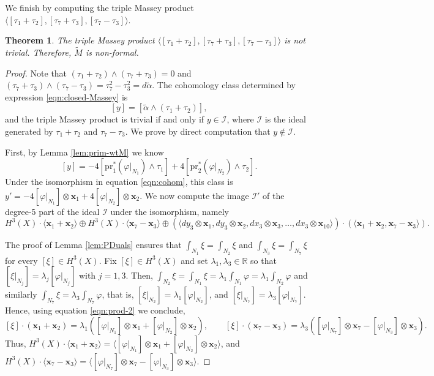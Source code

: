 \documentclass[10pt]{article}
\newcommand{\R}{\mathbb R}
\newcommand{\la}{\langle}
\newcommand{\ra}{\rangle}
\theoremstyle{plain}
\newtheorem{theorem}[proposition]{Theorem}
\theoremstyle{definition}
\theoremstyle{remark}
\begin{document}
We finish by computing the triple Massey product $\la [\tau_1 + \tau_2], [\tau_7+ \tau_3], [\tau_7-\tau_3] \ra$. 


\begin{theorem} \label {theo:non-formal}
The triple Massey product $\la [\tau_1 + \tau_2], [\tau_7+ \tau_3], [\tau_7-\tau_3] \ra$ is not trivial.
Therefore, $\widetilde{M}$ is non-formal.
\end{theorem}
\begin{proof}
Note that $(\tau_1 + \tau_2)\wedge (\tau_7+ \tau_3) =0$ and $(\tau_7+ \tau_3)\wedge (\tau_7-\tau_3)=\tau_7^2-\tau_3^2=d\widetilde{\alpha}$. The cohomology class determined by expression \eqref{eqn:closed-Massey} is
$$
[y]= [\widetilde{\alpha}\wedge (\tau_1 + \tau_2)],
$$
and the triple Massey product is trivial if and only if $y\in \mathcal{I}$, where
$\mathcal{I}$ is the ideal generated by $\tau_1 + \tau_2$ and $\tau_7-\tau_3$. We prove by direct computation that $y\notin \mathcal{I}$. 

First, by Lemma \ref{lem:prim-wtM} we know
$$
[y]= -4[\mathrm{pr}_1^*(\varphi|_{N_1}) \wedge \tau_1] + 4 [\mathrm{pr}_2^*(\varphi|_{N_2}) \wedge \tau_2].
$$
Under the isomorphism in equation \eqref{eqn:cohom}, this class is $y'=-4[\varphi|_{N_1}] \otimes \mathbf{x}_1 + 4[\varphi|_{N_2}]\otimes \mathbf{x}_2$.
We now compute the image  $\mathcal{I}'$ of the degree-5 part of the ideal $\mathcal{I}$ under the isomorphism,
namely
$$
H^3(X)\cdot \la \mathbf{x}_1+\mathbf{x}_2 \ra \oplus
H^3(X) \cdot \la \mathbf{x}_7-\mathbf{x}_3 \ra
\oplus (\la dy_3 \otimes \mathbf{x}_1, dy_3 \otimes \mathbf{x}_2, dx_3 \otimes \mathbf{x}_3, \dots, dx_3 \otimes \mathbf{x}_{10} \ra)\cdot (\la \mathbf{x}_1+\mathbf{x}_2 ,\mathbf{x}_7-\mathbf{x}_3 \ra) .
$$

The proof of Lemma \ref{lem:PDuals} ensures that 
 $\int_{N_1} \xi= \int_{N_2} \xi$ and  $\int_{N_3} \xi= \int_{N_7} \xi$ for every $[\xi] \in H^3(X)$.
 Fix $[\xi] \in H^3(X)$ and set $\lambda_1,\lambda_3\in \R$ so that $[\xi|_{N_j}]=\lambda_j [\varphi|_{N_j}]$ with $j=1,3$. Then, 
 $\int_{N_2}\xi=\int_{N_1}\xi= \lambda_1 \int_{N_1} \varphi= \lambda_1 \int_{N_2} \varphi$ and similarly $\int_{N_7}\xi= \lambda_3 \int_{N_7} \varphi$, that is, $[\xi|_{N_2}]=\lambda_1 [\varphi|_{N_2}]$, and  $[\xi|_{N_7}]=\lambda_3 [\varphi|_{N_7}]$. Hence, using equation \eqref{eqn:prod-2} we conclude, 
$$
[\xi] \cdot (\mathbf{x}_1+\mathbf{x}_2)= \lambda_1 ([\varphi|_{N_1}]\otimes \mathbf{x}_1+[\varphi|_{N_2}]\otimes \mathbf{x}_2), \qquad 
[\xi] \cdot (\mathbf{x}_7-\mathbf{x}_3)= \lambda_3 ( [\varphi|_{N_7}]\otimes \mathbf{x}_7-[\varphi|_{N_3}]\otimes \mathbf{x}_3).
$$
Thus,
$
H^3(X)\cdot \la \mathbf{x}_1+\mathbf{x}_2 \ra= \la [\varphi|_{N_1}]\otimes \mathbf{x}_1+[\varphi|_{N_2}]\otimes \mathbf{x}_2  \ra$, and  
$H^3(X)\cdot \la \mathbf{x}_7-\mathbf{x}_3 \ra= \la [\varphi|_{N_7}]\otimes \mathbf{x}_7-[\varphi|_{N_3}]\otimes \mathbf{x}_3  \ra .
$


\end{proof}
\end{document}

